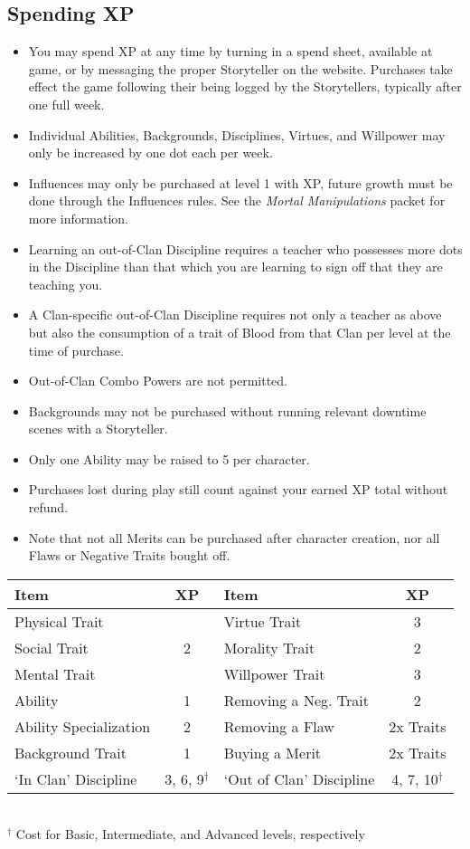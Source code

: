\subsection{Spending XP}
\begin{itemize}
	\item You may spend XP at any time by turning in a spend sheet, available at game, or by 
	messaging the proper Storyteller on the website.  Purchases take effect the game following their being 
	logged by the Storytellers, typically after one full week.
	\item Individual Abilities, Backgrounds, Disciplines, Virtues, and Willpower may only be 
	increased by one dot each per week.
	\item Influences may only be purchased at level 1 with XP, future growth must be done through 
	the Influences rules.  See the \emph{Mortal Manipulations} packet for more information.
	\item Learning an out-of-Clan Discipline requires a teacher who possesses more dots 
	in the Discipline than that which you are learning to sign off that they are teaching you.
	\item A Clan-specific out-of-Clan Discipline requires not only a teacher as above but also 
	the consumption of a trait of Blood from that Clan per level at the time of purchase.
	\item Out-of-Clan Combo Powers are not permitted.
	\item Backgrounds may not be purchased without running relevant downtime scenes with a Storyteller.
	\item Only one Ability may be raised to 5 per character.
	\item Purchases lost during play still count against your earned XP total without refund.
	\item Note that not all Merits can be purchased after character creation, nor all Flaws or Negative Traits bought off.
\end{itemize}

\begin{center}
{\footnotesize
	\begin{tabular}{| l | c || l | c |}
	   \hline
	   \textbf{Item} & \textbf{XP} & \textbf{Item} & \textbf{XP} \\
	   \hline
	   Physical Trait &  & Virtue Trait & 3 \\
	   Social Trait & 2 & Morality Trait & 2 \\
	   Mental Trait & & Willpower Trait & 3 \\
	   \hline
	   Ability & 1 & Removing a Neg. Trait & 2 \\
	   Ability Specialization & 2 & Removing a Flaw & 2x Traits \\
	   Background Trait & 1 & Buying a Merit & 2x Traits \\
	   \hline
	   `In Clan' Discipline & 3, 6, 9$^{\dagger}$ & `Out of Clan' Discipline & 4, 7, 10$^{\dagger}$ \\
	   \hline
	\end{tabular} \\
   {\footnotesize $^{\dagger}$ Cost for Basic, Intermediate, and Advanced levels, respectively}
}
\end{center}
